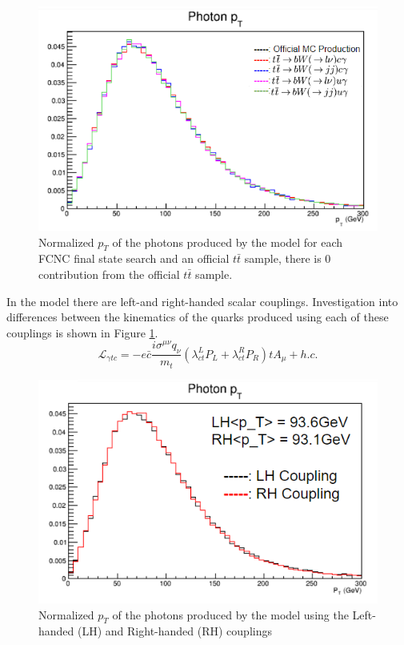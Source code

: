 \begin{figure}[h!]
	\centering
	\includegraphics[width=.8\columnwidth]{../ThesisImages/FCNCValidation/photon.png}
	\caption{Normalized $p_T$ of the photons produced by the model for each FCNC final state search and an official $t\bar{t}$ sample, there is 0 contribution from the official $t\bar{t}$ sample.
	}
\end{figure}

In the model there are left-and right-handed scalar couplings.  Investigation into differences between the kinematics of the quarks produced using each of these couplings is shown in Figure \ref{fig:LHRHcomp}.
\[ \mathcal{L}_{\gamma t c} = -e \bar{c} \frac{i\sigma^{\mu\nu}q_\nu}{m_t}(\lambda^L_{ct}P_L+\lambda^R_{ct}P_R )t A_\mu + h.c. \]

\begin{figure}[h!]
	\centering
	\includegraphics[width=.8\columnwidth]{../ThesisImages/FCNCValidation/PhotonLHRH.png}
	\caption{ Normalized $p_T$ of the photons produced by the model using the Left-handed (LH) and Right-handed (RH) couplings
	}
	\label{fig:LHRHcomp}
\end{figure}

